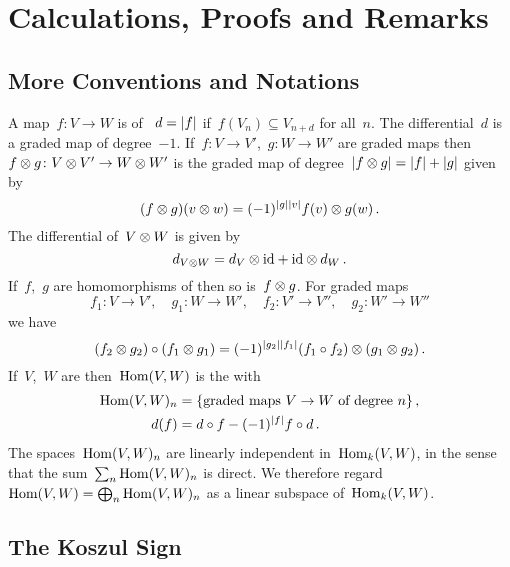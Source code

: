 \section{Calculations, Proofs and Remarks}



\subsection{More Conventions and Notations}

A map~$f \colon V \to W$ is  of ~$d = \lvert f\rvert$ if~$f(V_n) \subseteq V_{n+d}$ for all~$n$.
The differential~$d$ is a graded map of degree~$-1$.
If~$f \colon V \to V'$,~$g \colon W \to W'$ are graded maps then~$f \otimes g \colon V \otimes V' \to W \otimes W'$ is the graded map of degree~$\lvert f \otimes g\rvert = \lvert f\rvert + \lvert g\rvert$ given by
\[
  (f \otimes g)(v \otimes w)
  =
  (-1)^{\lvert g\rvert \lvert v\rvert}
  f(v) \otimes g(w) \,.
\]
The differential of~$V \otimes W$ is given by
\[
  d_{V \otimes W}
  =
  d_V \otimes {\operatorname{id}} + {\operatorname{id}} \otimes d_W \,.
\]
If~$f$,~$g$ are homomorphisms of {\dgvs} then so is~$f \otimes g$.
For graded maps
\[
  f_1 \colon V \to V',
  \quad
  g_1 \colon W \to W',
  \quad
  f_2 \colon V' \to V'',
  \quad
  g_2 \colon W' \to W''
\]
we have
\[
  (f_2 \otimes g_2) \circ (f_1 \otimes g_1)
  =
  (-1)^{\lvert g_2\rvert \lvert f_1\rvert} 
  (f_1 \circ f_2) \otimes (g_1 \otimes g_2) \,.
\]
If~$V$,~$W$ are {\dgvs} then~$\operatorname{Hom}(V,W)$ is the {\dgv} with
\begin{align*}
  \operatorname{Hom}(V,W)_n
  &=
  \{
    \text{graded maps~$V \to W$ of degree~$n$}
  \} \,,
  \\
  d(f)
  &=
  d \circ f - (-1)^{\lvert f\rvert} f \circ d \,.
\end{align*}
The spaces~$\operatorname{Hom}(V,W)_n$ are linearly independent in~$\operatorname{Hom}_k(V,W)$, in the sense that the sum~$\sum_n \operatorname{Hom}(V,W)_n$ is direct.
We therefore regard~$\operatorname{Hom}(V,W) = \bigoplus_n \operatorname{Hom}(V,W)_n$ as a linear subspace of~$\operatorname{Hom}_k(V,W)$.






\subsection{The Koszul Sign}
\label{koszul sign proof}

